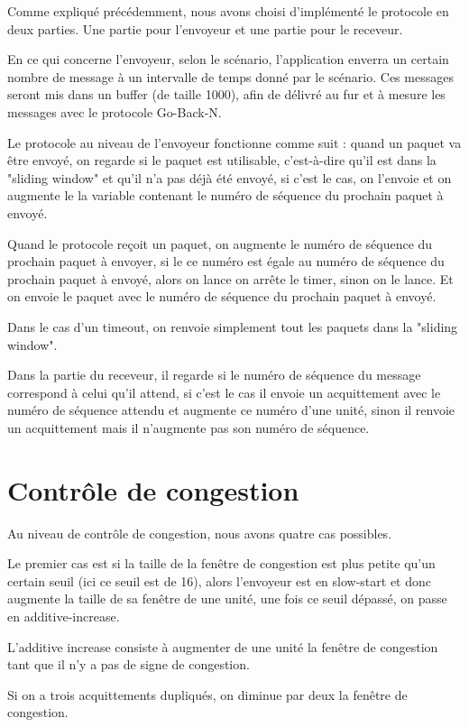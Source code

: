 \documentclass[11pt,a4paper]{article}
\begin{document}
	Comme expliqué précédemment, nous avons choisi d'implémenté le protocole en deux parties. Une partie pour l'envoyeur et une partie pour le receveur.
	
	En ce qui concerne l'envoyeur, selon le scénario, l'application enverra un certain nombre de message à un intervalle de temps donné par le scénario. Ces messages seront mis dans un buffer (de taille 1000), afin de délivré au fur et à mesure les messages avec le protocole Go-Back-N. 
	
	Le protocole au niveau de l'envoyeur fonctionne comme suit : quand un paquet va être envoyé, on regarde si le paquet est utilisable, c'est-à-dire qu'il est dans la "sliding window" et qu'il n'a pas déjà été envoyé, si c'est le cas, on l'envoie et on augmente le la variable contenant le numéro de séquence du prochain paquet à envoyé. 
	
	Quand le protocole reçoit un paquet,	on augmente le numéro de séquence du prochain paquet à envoyer, si le ce numéro est égale au numéro de séquence du prochain paquet à envoyé, alors on lance on arrête le timer, sinon on le lance. Et on envoie le paquet avec le numéro de séquence du prochain paquet à envoyé.
	
	Dans le cas d'un timeout, on renvoie simplement tout les paquets dans la "sliding window". 
	
	Dans la partie du receveur, il regarde si le numéro de séquence du message correspond à celui qu'il attend, si c'est le cas il envoie un acquittement avec le numéro de séquence attendu et augmente ce numéro d'une unité, sinon il renvoie un acquittement mais il n'augmente pas son numéro de séquence.
	
\section{Contrôle de congestion}
	
	Au niveau de contrôle de congestion, nous avons quatre cas possibles.
	
	Le premier cas est si la taille de la fenêtre de congestion est plus petite qu'un certain seuil (ici ce seuil est de 16), alors l'envoyeur est en slow-start et donc augmente la taille de sa fenêtre de une unité, une fois ce seuil dépassé, on passe en additive-increase.
	
	L'additive increase consiste à augmenter de une unité la fenêtre de congestion tant que il n'y a pas de signe de congestion.
	
	Si on a trois acquittements dupliqués, on diminue par deux la fenêtre de congestion.
	
\end{document}
